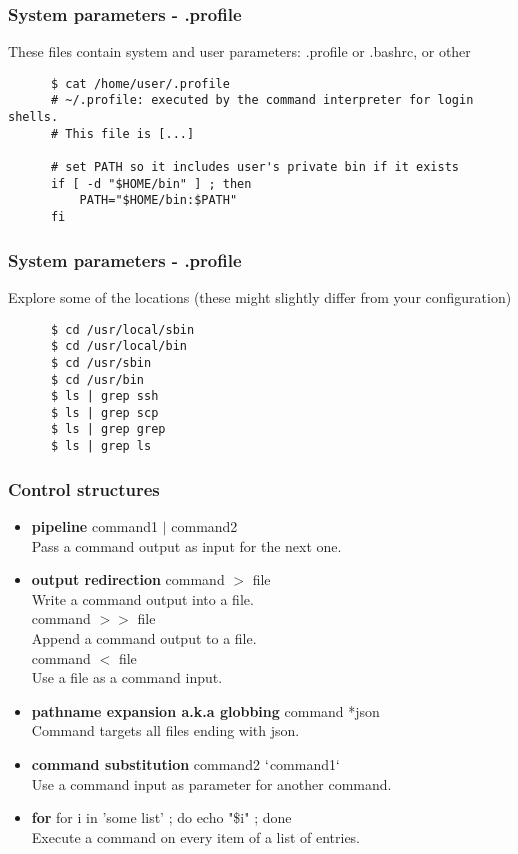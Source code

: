 \begin{frame}[fragile]
   \frametitle{System parameters - .profile}
   These files contain system and user parameters: .profile or .bashrc, or other
   \begin{verbatim}
      $ cat /home/user/.profile
      # ~/.profile: executed by the command interpreter for login shells.
      # This file is [...]

      # set PATH so it includes user's private bin if it exists
      if [ -d "$HOME/bin" ] ; then
          PATH="$HOME/bin:$PATH"
      fi
   \end{verbatim}
\end{frame}

\begin{frame}[fragile]
   \frametitle{System parameters - .profile}
   Explore some of the locations (these might slightly differ from your configuration)
   \begin{verbatim}
      $ cd /usr/local/sbin
      $ cd /usr/local/bin
      $ cd /usr/sbin
      $ cd /usr/bin
      $ ls | grep ssh
      $ ls | grep scp
      $ ls | grep grep
      $ ls | grep ls
   \end{verbatim}
\end{frame}

\begin{frame}[fragile]
   \frametitle{Control structures}
   \begin{itemize}
      \item {\bf pipeline} command1 $|$ command2 \\
            Pass a command output as input for the next one.
      \item {\bf output redirection} command $>$ file \\
            Write a command output into a file. \\
            command $>>$ file \\
            Append a command output to a file. \\
            command $<$ file \\
            Use a file as a command input.
      \item {\bf pathname expansion a.k.a globbing} command *json \\
            Command targets all files ending with json.
      \item {\bf command substitution} command2 $`$command1$`$ \\
            Use a command input as parameter for another command.
      \item {\bf for} for i in 'some list' ; do echo "\$i" ; done \\
            Execute a command on every item of a list of entries.
   \end{itemize}
\end{frame}

